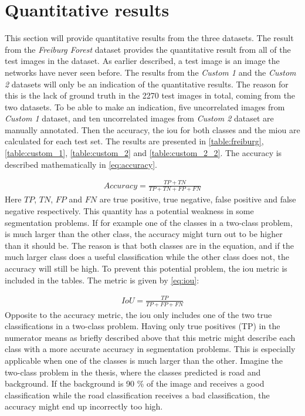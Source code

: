 \documentclass[USenglish]{ifimaster}  %
\begin{document}
\section{Quantitative results}\label{quantitative_results}
This section will provide quantitative results from the three datasets. The result from the \textit{Freiburg Forest} dataset provides the quantitative result from all of the test images in the dataset. As earlier described, a test image is an image the networks have never seen before. The results from the \textit{Custom 1} and the \textit{Custom 2} datasets will only be an indication of the quantitative results. The reason for this is the lack of ground truth in the 2270 test images in total, coming from the two datasets. To be able to make an indication, five uncorrelated images from \textit{Custom 1} dataset, and ten uncorrelated images from \textit{Custom 2} dataset are manually annotated. Then the accuracy, the \ac{iou} for both classes and the \ac{miou} are calculated for each test set. The results are presented in \cref{table:freiburg}, \cref{table:custom_1}, \cref{table:custom_2} and \cref{table:custom_2_2}. The accuracy is described mathematically in \cref{eq:accuracy}.

\begin{equation}\label{eq:accuracy}
\begin{aligned}
Accuracy = \frac{TP + TN}{TP + TN + FP + FN}
\end{aligned}
\end{equation}
Here $TP$, $TN$, $FP$ and $FN$ are true positive, true negative, false positive and false negative respectively. This quantity has a potential weakness in some segmentation problems. If for example one of the classes in a two-class problem, is much larger than the other class, the accuracy might turn out to be higher than it should be. The reason is that both classes are in the equation, and if the much larger class does a useful classification while the other class does not, the accuracy will still be high. To prevent this potential problem, the \ac{iou} metric is included in the tables. The metric is given by \cref{eq:iou}:

\begin{equation}\label{eq:iou}
\begin{aligned}
IoU = \frac{TP}{TP + FP + FN}
\end{aligned}
\end{equation}
Opposite to the accuracy metric, the \ac{iou} only includes one of the two true classifications in a two-class problem. Having only true positives (TP) in the numerator means as briefly described above that this metric might describe each class with a more accurate accuracy in segmentation problems. This is especially applicable when one of the classes is much larger than the other. Imagine the two-class problem in the thesis, where the classes predicted is road and background. If the background is 90 \% of the image and receives a good classification while the road classification receives a bad classification, the accuracy might end up incorrectly too high.
\end{document}
